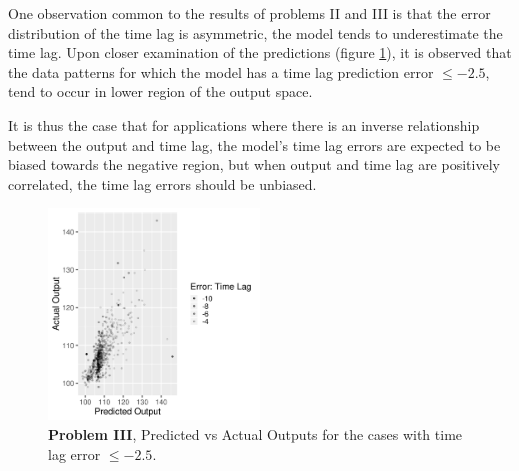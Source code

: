 \documentclass[envcountsect,runningheads]{llncs}
\theoremstyle{etoile}
\begin{document}
One observation common to the results of problems II and III is that the error distribution of 
the time lag is asymmetric, the model tends to underestimate the time lag. Upon closer examination 
of the predictions (figure \ref{fig:problem3_lag_error_jus}), it is observed that the data patterns 
for which the model has a time lag prediction error $\leq -2.5$, tend to occur in lower region of 
the output space. %

It is thus the case that for applications where there is an inverse relationship between the output 
and time lag, the model's time lag errors are expected to be biased towards the negative region, 
but when output and time lag are positively correlated, the time lag errors should be unbiased.

\begin{figure}[h]
\vspace{.3in}
\centerline{\includegraphics[width=0.5\textwidth]{figures/exp3_lag_error_jus.png}}
\vspace{.3in}
\caption{\textbf{Problem III}, Predicted vs Actual Outputs for the cases with time lag error $\leq -2.5$.}
\label{fig:problem3_lag_error_jus}
\end{figure}



\end{document}
